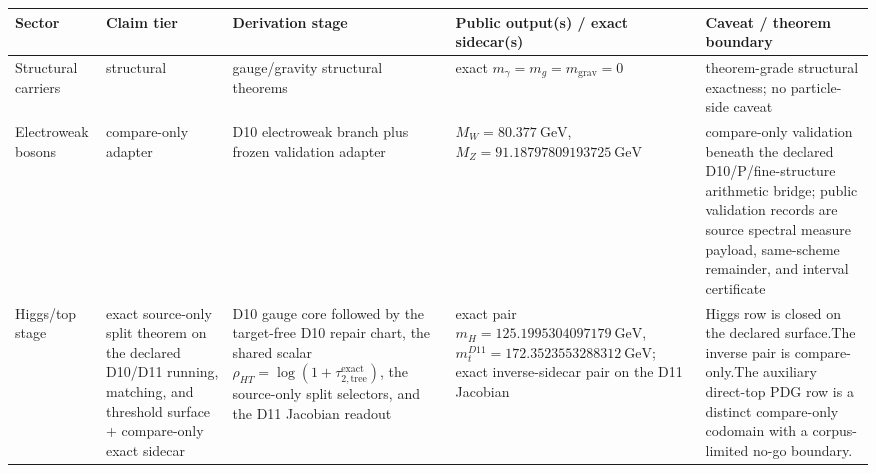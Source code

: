 \documentclass[11pt]{article}
\begin{document}
\begin{table}[h]
\centering
\tiny
\setlength{\tabcolsep}{2pt}
\begin{tabular}{@{}>{\raggedright\arraybackslash}p{}>{\raggedright\arraybackslash}p{}>{\raggedright\arraybackslash}p{}>{\raggedright\arraybackslash}p{}>{\raggedright\arraybackslash}p{}@{}}
\toprule
Sector & Claim tier & Derivation stage & Public output(s) / exact sidecar(s) & Caveat / theorem boundary \\
\midrule
Structural carriers & structural & gauge/gravity structural theorems & exact \(m_\gamma=m_g=m_{\mathrm{grav}}=0\) & theorem-grade structural exactness; no particle-side caveat \\
Electroweak bosons & compare-only adapter & D10 electroweak branch plus frozen validation adapter & \(M_W=80.377~\mathrm{GeV}\), \(M_Z=91.18797809193725~\mathrm{GeV}\) & compare-only validation beneath the declared D10/P/fine-structure arithmetic bridge; public validation records are source spectral measure payload, same-scheme remainder, and interval certificate \\
Higgs/top stage & exact source-only split theorem on the declared D10/D11 running, matching, and threshold surface + compare-only exact sidecar & D10 gauge core followed by the target-free D10 repair chart, the shared scalar \(\rho_{HT}=\log(1+\tau_{2,\mathrm{tree}}^{\mathrm{exact}})\), the source-only split selectors, and the D11 Jacobian readout & exact pair \(m_H=125.1995304097179~\mathrm{GeV}\), \(m_t^{D11}=172.3523553288312~\mathrm{GeV}\); exact inverse-sidecar pair on the D11 Jacobian & Higgs row is closed on the declared surface.\newline The inverse pair is compare-only.\newline The auxiliary direct-top PDG row is a distinct compare-only codomain with a corpus-limited no-go boundary. \\

\end{tabular}
\end{table}
\end{document}

